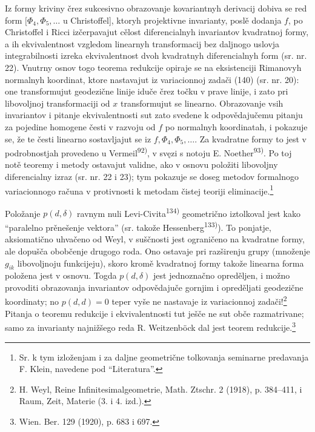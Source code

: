 \documentclass[11pt]{article}
\begin{document}
Iz formy kriviny črez sukcesivno obrazovanje kovariantnyh derivacij dobiva se red form $[\Phi_4,\Phi_5,\ldots$ u Christoffel], ktoryh projektivne invarianty, poslě dodanja $f$, po Christoffel i Ricci izčerpavajut cělost diferencialnyh invariantov kvadratnoj formy, a ih ekvivalentnost vzgledom linearnyh transformacij bez daljnogo uslovja integrabilnosti izreka ekvivalentnost dvoh kvadratnyh diferencialnyh form (sr. nr. 22). Vnutrny osnov togo teorema redukcije opiraje se na eksistenciji Rimanovyh normalnyh koordinat, ktore nastavajut iz variacionnoj zadači (140) (sr. nr. 20): one transformujut geodezične linije iduče črez točku v prave linije, i zato pri libovoljnoj transformaciji od $x$ transformujut se linearno. Obrazovanje vsih invariantov i pitanje ekvivalentnosti sut zato svedene k odpovědajučemu pitanju za pojedine homogene česti v razvoju od $f$ po normalnyh koordinatah, i pokazuje se, že te česti linearno sostavljajut se iz $f,\Phi_4,\Phi_5,\ldots$. Za kvadratne formy to jest v podrobnostjah provedeno u Vermeil\textsuperscript{92)}, v svęzi s notoju E. Noether\textsuperscript{93)}. Po toj notě teoremy i metody ostavajut validne, ako v osnovu položiti libovoljny diferencialny izraz (sr. nr. 22 i 23); tym pokazuje se doseg metodov formalnogo variacionnogo računa v protivnosti k metodam čistej teoriji eliminacije.\footnote{Sr. k tym izloženjam i za daljne geometrične tolkovanja seminarne predavanja F. Klein, navedene pod ``Literatura''.}

Položanje $p(d,\delta)$ ravnym nuli Levi-Civita\textsuperscript{134)} geometrično iztolkoval jest kako ``paralelno prěnešenje vektora'' (sr. takože Hessenberg\textsuperscript{133)}). To ponjatje, aksiomatično uhvačeno od Weyl, v suščnosti jest ograničeno na kvadratne formy, ale dopušča obobčenje drugogo roda. Ono ostavaje pri razširenju grupy (množenje $g_{ik}$ libovoljnoju funkcijeju), skoro kromě kvadratnoj formy takože linearna forma položena jest v osnovu. Togda $p(d,\delta)$ jest jednoznačno opreděljen, i možno provoditi obrazovanja invariantov odpovědajuče gornjim i opreděljati geodezične koordinaty; no $p(d,d)=0$ teper vyše ne nastavaje iz variacionnoj zadači!\footnote{H. Weyl, Reine Infinitesimalgeometrie, Math. Ztschr. 2 (1918), p. 384--411, i Raum, Zeit, Materie (3. i 4. izd.).} Pitanja o teoremu redukcije i ekvivalentnosti tut ješče ne sut obče razmatrivane; samo za invarianty najnižšego reda R. Weitzenböck dal jest teorem redukcije.\footnote{Wien. Ber. 129 (1920), p. 683 i 697.}
\end{document}
